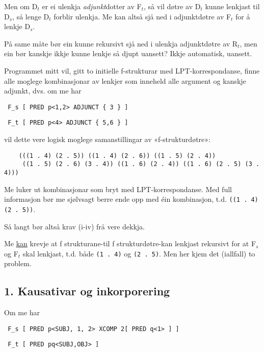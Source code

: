 \documentclass[11pt,a4paper,oneside,draft]{book}
\begin{document}
Men om D$_t$ er ei ulenkja \emph{adjunkt}dotter av F$_t$, så vil døtre av
D$_t$ kunne lenkjast til D$_s$, så lenge D$_t$ forblir ulenkja. Me kan altså
sjå ned i adjunktdøtre av F$_t$ for å lenkje D$_s$. 

På same måte bør ein kunne rekursivt sjå ned i ulenkja adjunktdøtre av
R$_t$, men ein bør kanskje ikkje kunne lenkje så djupt uansett? Ikkje
automatisk, uansett.



Programmet mitt vil, gitt to initielle f-strukturar med
LPT-korrespondanse, finne alle moglege kombinasjonar av lenkjer som
inneheld alle argument og kanskje adjunkt, dvs. om me har

\begin{verbatim}
 F_s [ PRED p<1,2> ADJUNCT { 3 } ]
\end{verbatim}


\begin{verbatim}
 F_t [ PRED p<4> ADJUNCT { 5,6 } ]
\end{verbatim}


vil dette vere logisk moglege samanstillingar av «f-strukturdøtre»:

\begin{verbatim}
    (((1 . 4) (2 . 5)) ((1 . 4) (2 . 6)) ((1 . 5) (2 . 4))
     ((1 . 5) (2 . 6) (3 . 4)) ((1 . 6) (2 . 4)) ((1 . 6) (2 . 5) (3 . 4)))
\end{verbatim}


Me luker ut kombinasjonar som bryt med LPT-korrespondanse. Med full
informasjon bør me sjølvsagt berre ende opp med éin kombinasjon,
t.d. \texttt{((1 . 4) (2 . 5))}.

Så langt bør altså krav (i-iv) frå \citet{dyvik2009lmp} vere dekkja.

Me \underline{kan} krevje at f strukturane-til f strukturdøtre-kan lenkjast
rekursivt for at F$_s$ og F$_t$ skal lenkjast, t.d. både \texttt{(1 . 4)} og \texttt{(2 . 5)}. Men her kjem det (iallfall) to problem.


\subsection{1. Kausativar og inkorporering}
\label{sec-3.13.1}

Om me har 

\begin{verbatim}
 F_s [ PRED p<SUBJ, 1, 2> XCOMP 2[ PRED q<1> ] ]
\end{verbatim}


\begin{verbatim}
 F_t [ PRED pq<SUBJ,OBJ> ]
\end{verbatim}
\end{document}
